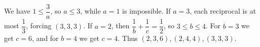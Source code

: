 We have $1\le\dfrac{3}{a}$, so $a\le3$, while $a=1$ is impossible. If $a=3$, each reciprocal is at most $\dfrac{1}{3}$, forcing $(3,3,3)$. If $a=2$, then $\dfrac{1}{b}+\dfrac{1}{c}=\dfrac{1}{2}$, so $3\le b\le4$. For $b=3$ we get $c=6$, and for $b=4$ we get $c=4$. Thus $\boxed{(2,3,6),(2,4,4),(3,3,3)}$.
